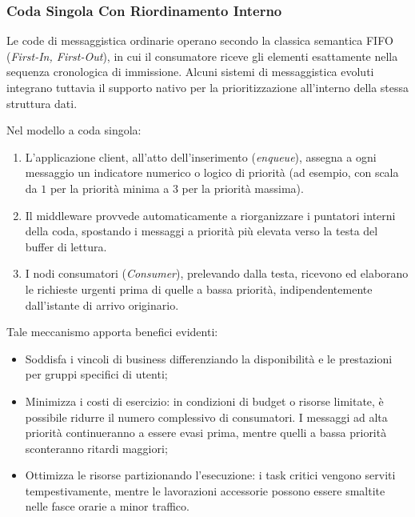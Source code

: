 \documentclass[11pt, a4paper]{article}
\begin{document}
\subsubsection{Coda Singola Con Riordinamento Interno}

Le code di messaggistica ordinarie operano secondo la classica semantica FIFO (\emph{First-In, First-Out}), in cui il consumatore riceve gli elementi esattamente nella sequenza cronologica di immissione. Alcuni sistemi di messaggistica evoluti integrano tuttavia il supporto nativo per la prioritizzazione all'interno della stessa struttura dati.


Nel modello a coda singola:
\begin{enumerate}
    \item L'applicazione client, all'atto dell'inserimento (\emph{enqueue}), assegna a ogni messaggio un indicatore numerico o logico di priorità (ad esempio, con scala da $1$ per la priorità minima a $3$ per la priorità massima).
    \item Il middleware provvede automaticamente a riorganizzare i puntatori interni della coda, spostando i messaggi a priorità più elevata verso la testa del buffer di lettura.
    \item I nodi consumatori (\emph{Consumer}), prelevando dalla testa, ricevono ed elaborano le richieste urgenti prima di quelle a bassa priorità, indipendentemente dall'istante di arrivo originario.
\end{enumerate}

Tale meccanismo apporta benefici evidenti:
\begin{itemize}[noitemsep]
    \item Soddisfa i vincoli di business differenziando la disponibilità e le prestazioni per gruppi specifici di utenti;
    \item Minimizza i costi di esercizio: in condizioni di budget o risorse limitate, è possibile ridurre il numero complessivo di consumatori. I messaggi ad alta priorità continueranno a essere evasi prima, mentre quelli a bassa priorità sconteranno ritardi maggiori;
    \item Ottimizza le risorse partizionando l'esecuzione: i task critici vengono serviti tempestivamente, mentre le lavorazioni accessorie possono essere smaltite nelle fasce orarie a minor traffico.
\end{itemize}
\end{document}

